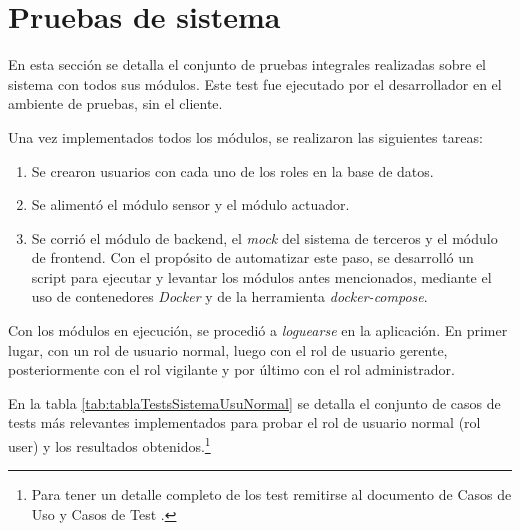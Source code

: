 \pagebreak
\section{Pruebas de sistema}

En esta sección se detalla el conjunto de pruebas integrales realizadas sobre el sistema con todos sus módulos. Este test fue ejecutado por el desarrollador en el ambiente de pruebas, sin el cliente.

Una vez implementados todos los módulos, se realizaron las siguientes tareas:

\begin{enumerate}
\item Se crearon usuarios con cada uno de los roles en la base de datos.
\item Se alimentó el módulo sensor y el módulo actuador.
\item Se corrió el módulo de backend, el \textit{mock} del sistema de terceros y el módulo de frontend. Con el propósito de automatizar este paso, se desarrolló un script para ejecutar y levantar los módulos antes mencionados, mediante el uso de contenedores \textit{Docker} y de la herramienta \textit{docker-compose}. 

\end{enumerate}

Con los módulos en ejecución, se procedió a \textit{loguearse} en la aplicación. En primer lugar, con un rol de usuario normal, luego con el rol de usuario gerente, posteriormente con el rol vigilante y por último con el rol administrador.

En la tabla  \ref{tab:tablaTestsSistemaUsuNormal} se detalla el conjunto de casos de tests más relevantes implementados para probar el rol de usuario normal (rol user) y los resultados obtenidos.\footnote{\label{notaReusadaCasosTest}Para tener un detalle completo de los test remitirse al documento de Casos de Uso y Casos de Test \citep{WEBSITE:CasosUsoYTest}.}

